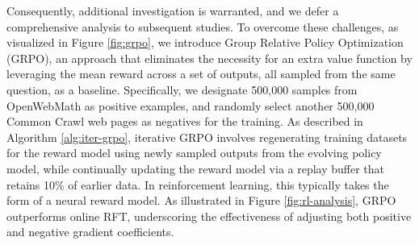 Consequently, additional investigation is warranted, and we defer a comprehensive analysis to subsequent studies. To overcome these challenges, as visualized in Figure \ref{fig:grpo}, we introduce Group Relative Policy Optimization (GRPO), an approach that eliminates the necessity for an extra value function by leveraging the mean reward across a set of outputs, all sampled from the same question, as a baseline. Specifically, we designate 500,000 samples from OpenWebMath as positive examples, and randomly select another 500,000 Common Crawl web pages as negatives for the training. As described in Algorithm \ref{alg:iter-grpo}, iterative GRPO involves regenerating training datasets for the reward model using newly sampled outputs from the evolving policy model, while continually updating the reward model via a replay buffer that retains 10\% of earlier data. In reinforcement learning, this typically takes the form of a neural reward model. As illustrated in Figure \ref{fig:rl-analysis}, GRPO outperforms online RFT, underscoring the effectiveness of adjusting both positive and negative gradient coefficients. 
